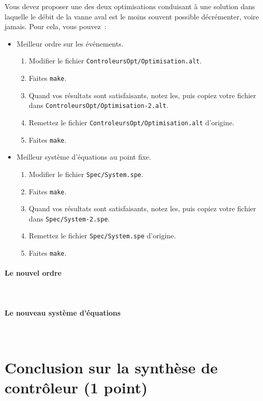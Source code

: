 \documentclass[a4paper]{book}
\begin{document}
Vous devez proposer une des deux optimisations conduisant à une solution dans laquelle le débit de la vanne aval est le moins souvent possible décrémenter, voire jamais. Pour cela, vous pouvez~:
\begin{itemize}
\item Meilleur ordre sur les événements.
  \begin{enumerate}
  \item Modifier le fichier \texttt{ControleursOpt/Optimisation.alt}.
  \item Faites \texttt{make}.
  \item Quand vos résultats sont satisfaisants, notez les, puis copiez votre fichier dans \texttt{ControleursOpt/Optimisation-2.alt}.
  \item Remettez le fichier \texttt{ControleursOpt/Optimisation.alt} d'origine.
  \item Faites \texttt{make}.
  \end{enumerate}
\item Meilleur système d'équations au point fixe.
  \begin{enumerate}
  \item Modifier le fichier \texttt{Spec/System.spe}.
  \item Faites \texttt{make}.
  \item Quand vos résultats sont satisfaisants, notez les, puis copiez votre fichier dans \texttt{Spec/System-2.spe}.
  \item Remettez le fichier \texttt{Spec/System.spe} d'origine.
  \item Faites \texttt{make}.
  \end{enumerate}
\end{itemize}

\paragraph{Le nouvel ordre}\ \\
\small{}

\paragraph{Le nouveau système d'équations}\ \\
\small{}

\section{Conclusion sur la synthèse de contrôleur (1 point)}
\end{document}
